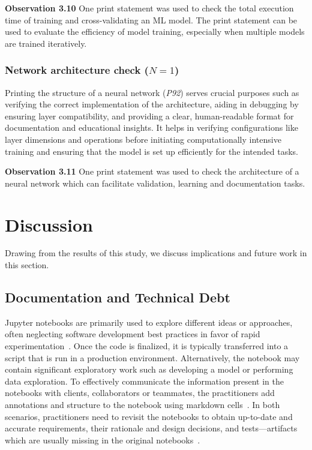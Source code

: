 \documentclass[smallextended]{svjour3}       %
\newcommand{\highlight}[1]{\begin{framed}%
  \noindent#1
\end{framed}}
\begin{document}
\highlight{\textbf{Observation 3.10} One print statement was used to check the total execution time of training and cross-validating an ML model. The print statement can be used to evaluate the efficiency of model training, especially when multiple models are trained iteratively.}

\subsubsection{Network architecture check ($N = 1$)}

Printing the structure of a neural network (\emph{P92}) serves crucial purposes such as verifying the correct implementation of the architecture, aiding in debugging by ensuring layer compatibility, and providing a clear, human-readable format for documentation and educational insights. It helps in verifying configurations like layer dimensions and operations before initiating computationally intensive training and ensuring that the model is set up efficiently for the intended tasks.

\highlight{\textbf{Observation 3.11} One print statement was used to check the architecture of a neural network which can facilitate validation, learning and documentation tasks.}

\section{Discussion}\label{sec:discuss}

Drawing from the results of this study, we discuss implications and future work in this section.

\subsection{Documentation and Technical Debt}

Jupyter notebooks are primarily used to explore different ideas or approaches, often neglecting software development best practices in favor of rapid experimentation~\citep{kery2018story,rule2018exploration,pimentel2019large-scale}. Once the code is finalized, it is typically transferred into a script that is run in a production environment. Alternatively, the notebook may contain significant exploratory work such as developing a model or performing data exploration. To effectively communicate the information present in the notebooks with clients, collaborators or teammates, the practitioners add annotations and structure to the notebook using markdown cells~\citep{kery2018story,rule2018exploration}. In both scenarios, practitioners need to revisit the notebooks to obtain up-to-date and accurate requirements, their rationale and design decisions, and tests---artifacts which are usually missing in the original notebooks~\citep{pimentel2019large-scale,psallidas2019data,grotov2022large-scale}.
\end{document}
